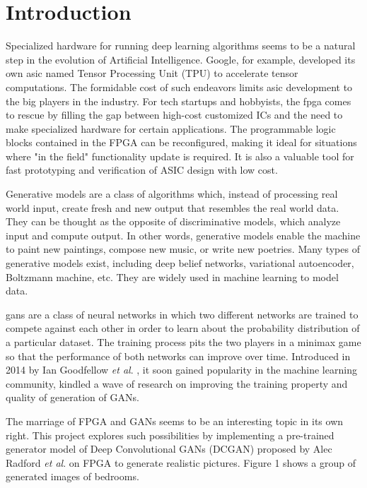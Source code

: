 
\chapter{Introduction}

Specialized hardware for running deep learning algorithms seems to be a natural step in the evolution of
Artificial Intelligence.  Google, for example, developed its own \gls{asic} named Tensor Processing Unit (TPU)
to accelerate tensor computations. The formidable cost of such endeavors limits \gls{asic} development to
the big players in the industry. For tech startups and hobbyists, the \gls{fpga} comes to rescue by filling
the gap between high-cost customized ICs and the need to make specialized hardware for certain
applications. The programmable logic blocks contained in the FPGA can be reconfigured, making it ideal for
situations where "in the field" functionality update is required. It is also a valuable tool for fast
prototyping and verification of ASIC design with low cost.

Generative models are a class of algorithms which, instead of processing real world input, create fresh and
new output that resembles the real world data. They can be thought as the opposite of discriminative models,
which analyze input and compute output. In other words, generative models enable the machine to paint new
paintings, compose new music, or write new poetries. Many types of generative models exist, including deep
belief networks, variational autoencoder, Boltzmann machine, etc. They are widely used in machine learning
to model data.

\gls{gans} are a class of neural networks in which two different networks are trained to compete against
each other in order to learn about the probability distribution of a particular dataset. The training
process pits the two players in a minimax game so that the performance of both networks can improve over
time. Introduced in 2014 by Ian Goodfellow \textit{et al}. \cite{goodfellow:gan}, it soon gained popularity
in the machine learning community, kindled a wave of research on improving the training property and
quality of generation of GANs.

The marriage of FPGA and GANs seems to be an interesting topic in its own right. This project explores such
possibilities by implementing a pre-trained generator model of Deep Convolutional GANs (DCGAN) proposed by
Alec Radford \textit{et al}. \cite{radford:conv_gan} on FPGA to generate realistic pictures.
Figure 1 shows a group of generated images of bedrooms.

